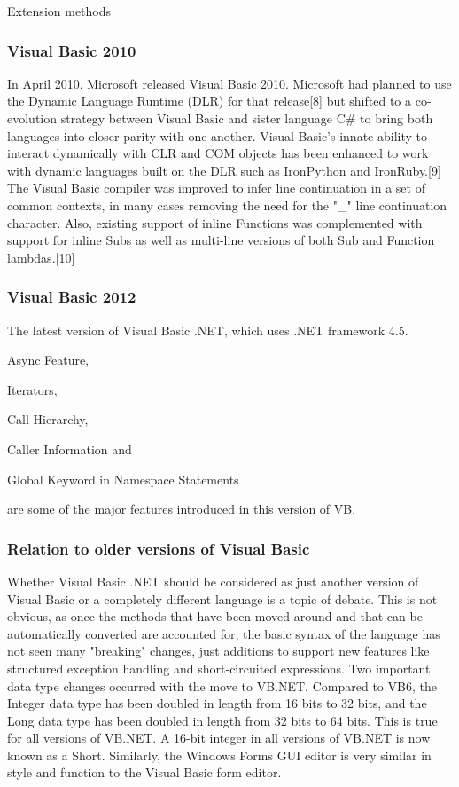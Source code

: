 Extension methods

\subsubsection{Visual Basic 2010}

In April 2010, Microsoft released Visual Basic 2010. Microsoft had planned to use the Dynamic Language Runtime (DLR) for that release[8] but shifted to a co-evolution strategy between Visual Basic and sister language C\# to bring both languages into closer parity with one another. Visual Basic's innate ability to interact dynamically with CLR and COM objects has been enhanced to work with dynamic languages built on the DLR such as IronPython and IronRuby.[9] The Visual Basic compiler was improved to infer line continuation in a set of common contexts, in many cases removing the need for the "\_" line continuation character. Also, existing support of inline Functions was complemented with support for inline Subs as well as multi-line versions of both Sub and Function lambdas.[10]


\subsubsection{Visual Basic 2012}

The latest version of Visual Basic .NET, which uses .NET framework 4.5. 

Async Feature, 

Iterators, 

Call Hierarchy, 

Caller Information and 

Global Keyword in Namespace Statements 

are some of the major features introduced in this version of VB.

\subsubsection{Relation to older versions of Visual Basic}

Whether Visual Basic .NET should be considered as just another version of Visual Basic or a completely different language is a topic of debate. This is not obvious, as once the methods that have been moved around and that can be automatically converted are accounted for, the basic syntax of the language has not seen many "breaking" changes, just additions to support new features like structured exception handling and short-circuited expressions. Two important data type changes occurred with the move to VB.NET. Compared to VB6, the Integer data type has been doubled in length from 16 bits to 32 bits, and the Long data type has been doubled in length from 32 bits to 64 bits. This is true for all versions of VB.NET. A 16-bit integer in all versions of VB.NET is now known as a Short. Similarly, the Windows Forms GUI editor is very similar in style and function to the Visual Basic form editor.

